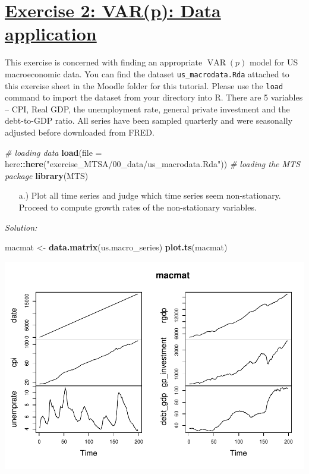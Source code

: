 \documentclass[12pt,a4paper]{article}
\newcommand{\VAR}{\operatorname{VAR}} %
\newcommand{\tmpsection}[1]{}
\let\tmpsection=\section
\renewcommand{\section}[1]{\tmpsection{\underline{#1}} }
\newenvironment{Shaded}{\begin{snugshade}}{\end{snugshade}}
\newcommand{\CommentTok}[1]{\textcolor[rgb]{0.56,0.35,0.01}{\textit{#1}}}
\newcommand{\DataTypeTok}[1]{\textcolor[rgb]{0.13,0.29,0.53}{#1}}
\newcommand{\KeywordTok}[1]{\textcolor[rgb]{0.13,0.29,0.53}{\textbf{#1}}}
\newcommand{\NormalTok}[1]{#1}
\newcommand{\OperatorTok}[1]{\textcolor[rgb]{0.81,0.36,0.00}{\textbf{#1}}}
\newcommand{\StringTok}[1]{\textcolor[rgb]{0.31,0.60,0.02}{#1}}
\begin{document}
\hypertarget{exercise-2-varp-data-application}{%
\section{Exercise 2: VAR(p): Data
application}\label{exercise-2-varp-data-application}}

This exercise is concerned with finding an appropriate \(\VAR(p)\) model
for US macroeconomic data. You can find the dataset
\texttt{us\_macrodata.Rda} attached to this exercise sheet in the Moodle
folder for this tutorial. Please use the \texttt{load} command to import
the dataset from your directory into R. There are 5 variables -- CPI,
Real GDP, the unemployment rate, general private investment and the
debt-to-GDP ratio. All series have been sampled quarterly and were
seasonally adjusted before downloaded from FRED.

\begin{Shaded}
\begin{Highlighting}[]
\CommentTok{# loading data}
\KeywordTok{load}\NormalTok{(}\DataTypeTok{file =}\NormalTok{ here}\OperatorTok{::}\KeywordTok{here}\NormalTok{(}\StringTok{"exercise_MTSA/00_data/us_macrodata.Rda"}\NormalTok{))}
\CommentTok{# loading the MTS package}
\KeywordTok{library}\NormalTok{(MTS)}
\end{Highlighting}
\end{Shaded}

\begin{itemize}
  \item[a.)] Plot all time series and judge which time series seem non-stationary. Proceed to compute growth rates of the non-stationary variables.
\end{itemize}

\emph{Solution:}

\begin{Shaded}
\begin{Highlighting}[]
\NormalTok{macmat <-}\StringTok{ }\KeywordTok{data.matrix}\NormalTok{(us.macro_series)}
\KeywordTok{plot.ts}\NormalTok{(macmat)}
\end{Highlighting}
\end{Shaded}

\includegraphics{solution_exercise_5_files/figure-latex/unnamed-chunk-3-1.pdf}
\end{document}
